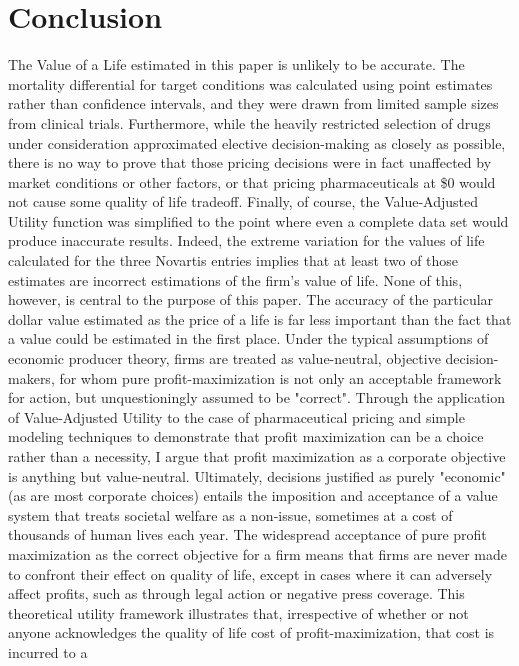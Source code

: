 \documentclass[12pt,english]{article} \usepackage{mathptmx}
\begin{document}
\section{Conclusion}\label{sec:conclusion} The Value of a Life estimated 
in this paper is unlikely to be accurate. The mortality differential for 
target conditions was calculated using point estimates rather than 
confidence intervals, and they were drawn from limited sample sizes from 
clinical trials. Furthermore, while the heavily restricted selection of 
drugs under consideration approximated elective decision-making as 
closely as possible, there is no way to prove that those pricing 
decisions were in fact unaffected by market conditions or other factors, 
or that pricing pharmaceuticals at \$0 would not cause some quality of 
life tradeoff. Finally, of course, the Value-Adjusted Utility function 
was simplified to the point where even a complete data set would produce 
inaccurate results. Indeed, the extreme variation for the values of life 
calculated for the three Novartis entries implies that at least two of 
those estimates are incorrect estimations of the firm's value of life. 
None of this, however, is central to the purpose of this paper. The 
accuracy of the particular dollar value estimated as the price of a life 
is far less important than the fact that a value could be estimated in 
the first place. Under the typical assumptions of economic producer 
theory, firms are treated as value-neutral, objective decision-makers, 
for whom pure profit-maximization is not only an acceptable framework 
for action, but unquestioningly assumed to be "correct". Through the 
application of Value-Adjusted Utility to the case of pharmaceutical 
pricing and simple modeling techniques to demonstrate that profit 
maximization can be a choice rather than a necessity, I argue that 
profit maximization as a corporate objective is anything but 
value-neutral. Ultimately, decisions justified as purely "economic" (as 
are most corporate choices) entails the imposition and acceptance of a 
value system that treats societal welfare as a non-issue, sometimes at a 
cost of thousands of human lives each year. The widespread acceptance of 
pure profit maximization as the correct objective for a firm means that 
firms are never made to confront their effect on quality of life, except 
in cases where it can adversely affect profits, such as through legal 
action or negative press coverage. This theoretical utility framework 
illustrates that, irrespective of whether or not anyone acknowledges the 
quality of life cost of profit-maximization, that cost is incurred to a 
\end{document}
